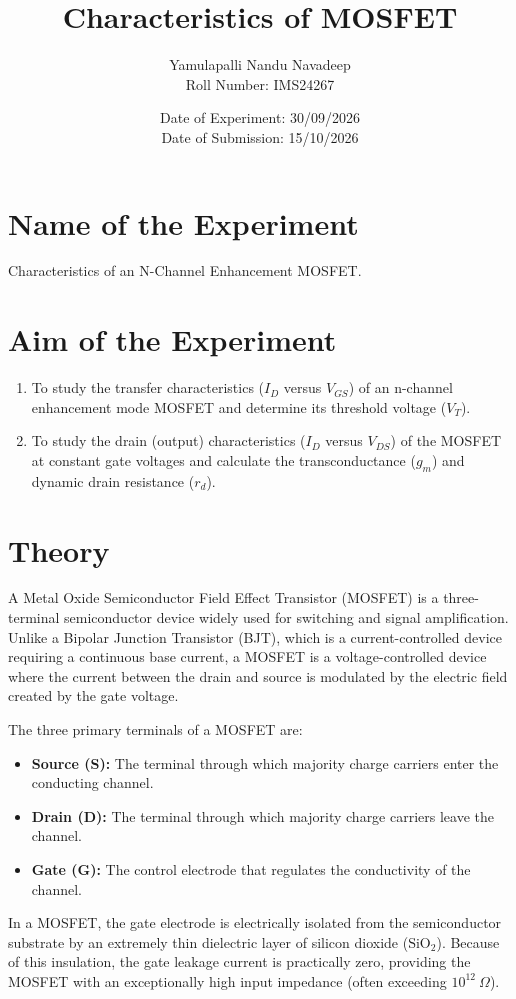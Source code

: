 \documentclass[12pt,a4paper]{article}
\title{\textbf{Characteristics of MOSFET}}
\author{Yamulapalli Nandu Navadeep \\ Roll Number: IMS24267}
\date{Date of Experiment: 30/09/2026 \\ Date of Submission: 15/10/2026}
\begin{document}
\maketitle

\section{Name of the Experiment}
Characteristics of an N-Channel Enhancement MOSFET.

\section{Aim of the Experiment}
\begin{enumerate}
    \item To study the transfer characteristics ($I_D$ versus $V_{GS}$) of an n-channel enhancement mode MOSFET and determine its threshold voltage ($V_T$).
    \item To study the drain (output) characteristics ($I_D$ versus $V_{DS}$) of the MOSFET at constant gate voltages and calculate the transconductance ($g_m$) and dynamic drain resistance ($r_d$).
\end{enumerate}

\section{Theory}
A Metal Oxide Semiconductor Field Effect Transistor (MOSFET) is a three-terminal semiconductor device widely used for switching and signal amplification. Unlike a Bipolar Junction Transistor (BJT), which is a current-controlled device requiring a continuous base current, a MOSFET is a voltage-controlled device where the current between the drain and source is modulated by the electric field created by the gate voltage.

The three primary terminals of a MOSFET are:
\begin{itemize}
    \item \textbf{Source (S):} The terminal through which majority charge carriers enter the conducting channel.
    \item \textbf{Drain (D):} The terminal through which majority charge carriers leave the channel.
    \item \textbf{Gate (G):} The control electrode that regulates the conductivity of the channel.
\end{itemize}

In a MOSFET, the gate electrode is electrically isolated from the semiconductor substrate by an extremely thin dielectric layer of silicon dioxide ($\text{SiO}_2$). Because of this insulation, the gate leakage current is practically zero, providing the MOSFET with an exceptionally high input impedance (often exceeding $10^{12}\ \Omega$).
\end{document}
